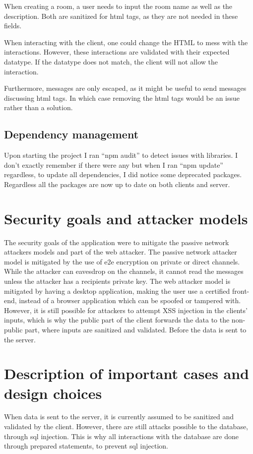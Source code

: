 \documentclass[a4paper]{article}
\begin{document}
When creating a room, a user needs to input the room name as well as the description. Both are sanitized for html tags, as they are not needed in these fields.

When interacting with the client, one could change the HTML to mess with the interactions. However, these interactions are validated with their expected datatype. If the datatype does not match, the client will not allow the interaction.

Furthermore, messages are only escaped, as it might be useful to send messages discussing html tags. In which case removing the html tags would be an issue rather than a solution.

\subsection{Dependency management}
Upon starting the project I ran \enquote{npm audit} to detect issues with libraries. I don't exactly remember if there were any but when I ran \enquote{npm update} regardless, to update all dependencies, I did notice some deprecated packages. Regardless all the packages are now up to date on both clients and server.
\section{Security goals and attacker models}
The security goals of the application were to mitigate the passive network attackers models and part of the web attacker. The passive network attacker model is mitigated by the use of e2e encryption on private or direct channels. While the attacker can eavesdrop on the channels, it cannot read the messages unless the attacker has a recipients private key. The web attacker model is mitigated by having a desktop application, making the user use a certified front-end, instead of a browser application which can be spoofed or tampered with. However, it is still possible for attackers to attempt XSS injection in the clients' inputs, which is why the public part of the client forwards the data to the non-public part, where inputs are sanitized and validated. Before the data is sent to the server.

\section{Description of important cases and design choices}
When data is sent to the server, it is currently assumed to be sanitized and validated by the client. However, there are still attacks possible to the database, through sql injection. This is why all interactions with the database are done through prepared statements, to prevent sql injection.
\end{document}
